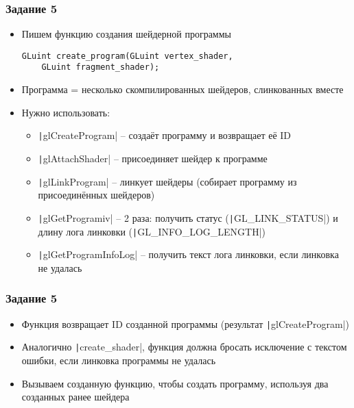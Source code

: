 \documentclass[10pt]{beamer}
\begin{document}
\begin{frame}[fragile]
\frametitle{Задание 5}
\begin{itemize}
\item Пишем функцию создания шейдерной программы
\begin{verbatim}
GLuint create_program(GLuint vertex_shader,
    GLuint fragment_shader);
\end{verbatim}
\item Программа = несколько скомпилированных шейдеров, слинкованных вместе
\item Нужно использовать:
\begin{itemize}
\item \texttt|glCreateProgram| -- создаёт программу и возвращает её ID
\item \texttt|glAttachShader| -- присоединяет шейдер к программе
\item \texttt|glLinkProgram| -- линкует шейдеры (собирает программу из присоединённых шейдеров)
\item \texttt|glGetProgramiv| -- 2 раза: получить статус (\texttt|GL_LINK_STATUS|) и длину лога линковки (\texttt|GL_INFO_LOG_LENGTH|)
\item \texttt|glGetProgramInfoLog| -- получить текст лога линковки, если линковка не удалась
\end{itemize}
\end{itemize}
\end{frame}

\begin{frame}[fragile]
\frametitle{Задание 5}
\begin{itemize}
\item Функция возвращает ID созданной программы (результат \texttt|glCreateProgram|)
\item Аналогично \texttt|create_shader|, функция должна бросать исключение с текстом ошибки, если линковка программы не удалась
\item Вызываем созданную функцию, чтобы создать программу, используя два созданных ранее шейдера
\end{itemize}
\end{frame}
\end{document}
